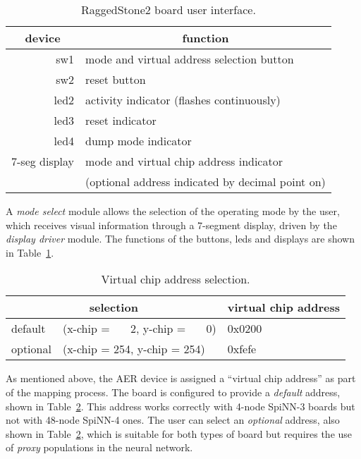 \begin{table}[!h]
\begin{center}
\begin{tabular}{| r | l |}
\hline
\multicolumn{1}{|c}{device} & \multicolumn{1}{|c|}{function} \\
\hline
sw1           & mode and virtual address selection button \\
sw2           & reset button \\
\hline
led2          & activity indicator (flashes continuously) \\
led3          & reset indicator \\
led4          & dump mode indicator \\
\hline
7-seg display & mode and virtual chip address indicator \\
              & (optional address indicated by decimal point on) \\
\hline
\end{tabular}
\caption{RaggedStone2 board user interface.}
\label{tab:userif}
\end{center}
\end{table}


A \emph{mode select} module allows the selection of the operating mode by the user, which receives visual information through a 7-segment display, driven by the \emph{display driver} module. The functions of the buttons, leds and displays are shown in Table~\ref{tab:userif}.\\


\begin{table}[!hp]
\begin{center}
\begin{tabular}{| l  l | l |}
\hline
\multicolumn{2}{|c}{selection} & \multicolumn{1}{|c|}{virtual chip address} \\
\hline
default    &  (x-chip = ~~~2, y-chip = ~~~0) & 0x0200  \\
optional  &  (x-chip = 254, y-chip = 254)  & 0xfefe \\
\hline
\end{tabular}
\caption{Virtual chip address selection.}
\label{tab:addrs}
\end{center}
\end{table}


As mentioned above, the AER device is assigned a ``virtual chip address'' as part of the mapping process. The board is configured to provide a \emph{default} address, shown in Table~\ref{tab:addrs}. This address works correctly with 4-node SpiNN-3 boards but not with 48-node SpiNN-4 ones. The user can select an \emph{optional} address, also shown in Table~\ref{tab:addrs}, which is suitable for both types of board but requires the use of \emph{proxy} populations in the neural network.

